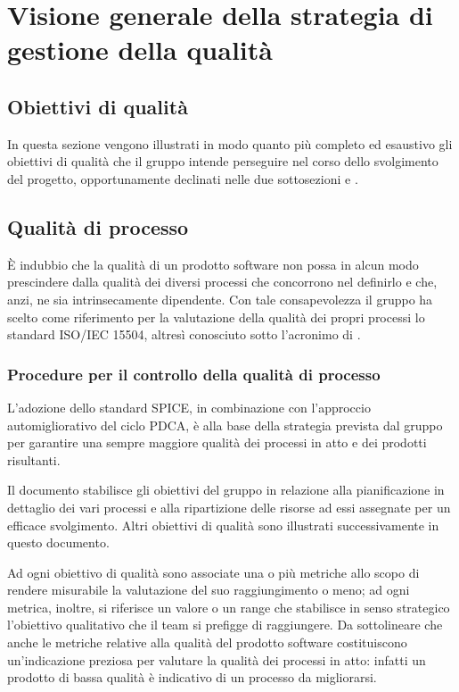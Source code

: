 
\section{Visione generale della strategia di gestione della qualità}
	\subsection{Obiettivi di qualità}
	In questa sezione vengono illustrati in modo quanto più completo ed esaustivo gli obiettivi di qualità che il gruppo intende perseguire nel corso 	dello svolgimento del progetto, opportunamente declinati nelle due sottosezioni  e .

	\subsection{Qualità di processo} \label{sec:qualprocesso}
	È indubbio che la qualità di un prodotto software non possa in alcun modo prescindere dalla qualità dei diversi processi che concorrono nel definirlo e 	che, anzi, ne sia intrinsecamente dipendente. Con tale consapevolezza il gruppo ha scelto come riferimento per la valutazione della qualità dei propri processi lo standard ISO/IEC 15504, altresì conosciuto sotto l'acronimo di .
		\subsubsection{Procedure per il controllo della qualità di processo}
		L'adozione dello standard SPICE, in combinazione con l'approccio automigliorativo del ciclo PDCA, è alla base della strategia prevista dal gruppo per garantire una sempre maggiore qualità dei processi in atto e dei prodotti risultanti.

		Il documento \PdP{} stabilisce gli obiettivi del gruppo in relazione alla pianificazione in dettaglio dei vari processi e alla ripartizione delle risorse ad essi assegnate per un efficace svolgimento. Altri obiettivi di qualità sono illustrati successivamente in questo documento.

		Ad ogni obiettivo di qualità sono associate una o più metriche allo scopo di rendere misurabile la valutazione del suo raggiungimento o meno; ad ogni metrica, inoltre, si riferisce un valore o un range che stabilisce in senso strategico l'obiettivo qualitativo che il team si prefigge di raggiungere. Da sottolineare che anche le metriche relative alla qualità del prodotto software costituiscono un'indicazione preziosa per valutare la qualità dei processi in atto: infatti un prodotto di bassa qualità è indicativo di un processo da migliorarsi.

